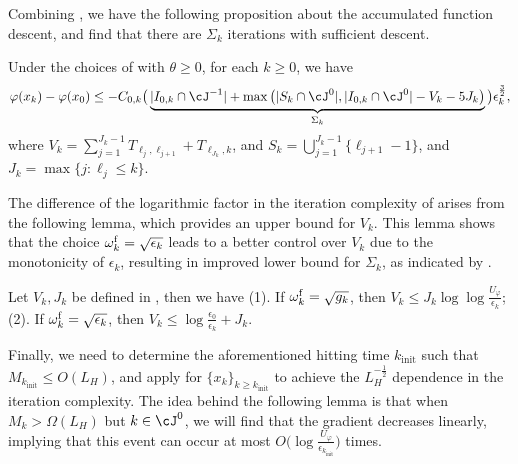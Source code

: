 Combining , we have the following proposition about the accumulated function descent, 
and find that there are $\Sigma_k$ iterations with sufficient descent.

\begin{proposition}
    \label{prop:main/accumulated-descent}
    Under the choices of  with $\theta \geq 0$, 
    for each $k \geq 0$, we have
    \begin{align}
        \varphi(x_{k})
        - \varphi(x_0)
        \leq
         - C_{0,k}
        \big (\underbrace{
            |I_{0,k} \cap \cJ^{-1}|
            + \max\big( |S_k \cap \cJ^0|, |I_{0,k} \cap \cJ^0| - V_k - 5J_k \big)
            }_{\Sigma_k} \big )
         \epsilon_k^{\frac{3}{2}}
         ,
        \label{eqn:main/newton-global-final-inequality}
    \end{align}
    where $V_k = \sum_{j=1}^{J_k-1} T_{\ell_j,\ell_{j+1}} + T_{\ell_{J_k},k}$,
    and $S_k = \bigcup_{j=1}^{J_k-1}\{\ell_{j+1}-1\}$,
    and $J_k = \max\{ j : \ell_j \leq k \}$.
\end{proposition}

The difference of the logarithmic factor in the iteration complexity of  arises from the following lemma, which provides an upper bound for $V_k$.
This lemma shows that the choice $\omega_k^{\mathrm{f}} = \sqrt{\epsilon_k}$ leads to a better control over $V_k$ due to the monotonicity of $\epsilon_k$, 
resulting in improved lower bound for $\Sigma_k$, as indicated by . %
\begin{lemma}
    \label{lem:main/lower-bound-of-Vk}
    Let $V_k, J_k$ be defined in , then we have
    (1). If $\omega_k^{\mathrm{f}} = \sqrt{g_k}$, then $V_k \leq J_k \log\log \frac{U_\varphi}{\epsilon_k}$;
    (2). If $\omega_k^{\mathrm{f}} = \sqrt{\epsilon_k}$, then $V_k \leq \log \frac{\epsilon_0}{\epsilon_k} + J_k$.
\end{lemma}


Finally, we need to determine the aforementioned hitting time $k_{\mathrm{init}}$ such that $M_{k_\mathrm{init}} \leq O(L_H)$,
and apply  for $\{ x_k \}_{k \geq k_{\mathrm{init}}}$ to achieve the $L_H^{-\frac{1}{2}}$ dependence in the iteration complexity.
The idea behind the following lemma is that when $M_k > \Omega(L_H)$ but $k \in \cJ^0$, we will find that the gradient decreases linearly, implying that this event can occur at most $O\big ( \log \frac{U_\varphi}{\epsilon_{k_{\mathrm{init}}}} \big )$ times.


